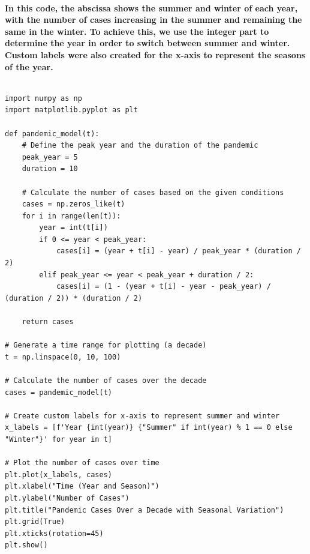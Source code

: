 \paragraph{In this code, the abscissa shows the summer and winter of each year, with the number of cases increasing in the summer and remaining the same in the winter. To achieve this, we use the integer part to determine the year in order to switch between summer and winter. Custom labels were also created for the x-axis to represent the seasons of the year.}
% 
$$  $$
% 
% 
\begin{lstlisting}[style=pystyle]
import numpy as np
import matplotlib.pyplot as plt

def pandemic_model(t):
    # Define the peak year and the duration of the pandemic
    peak_year = 5
    duration = 10

    # Calculate the number of cases based on the given conditions
    cases = np.zeros_like(t)
    for i in range(len(t)):
        year = int(t[i])
        if 0 <= year < peak_year:
            cases[i] = (year + t[i] - year) / peak_year * (duration / 2)
        elif peak_year <= year < peak_year + duration / 2:
            cases[i] = (1 - (year + t[i] - year - peak_year) / (duration / 2)) * (duration / 2)

    return cases

# Generate a time range for plotting (a decade)
t = np.linspace(0, 10, 100)

# Calculate the number of cases over the decade
cases = pandemic_model(t)

# Create custom labels for x-axis to represent summer and winter
x_labels = [f'Year {int(year)} {"Summer" if int(year) % 1 == 0 else "Winter"}' for year in t]

# Plot the number of cases over time
plt.plot(x_labels, cases)
plt.xlabel("Time (Year and Season)")
plt.ylabel("Number of Cases")
plt.title("Pandemic Cases Over a Decade with Seasonal Variation")
plt.grid(True)
plt.xticks(rotation=45)
plt.show()
\end{lstlisting}
% 
% 
% 
% 
% 
% 
% 
% 
% 
% 
% 
